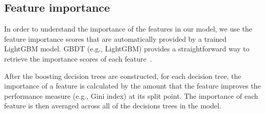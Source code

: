
\subsection{Feature importance}

In order to understand the importance of the features in our model, we use the feature importance scores that are automatically provided by a trained LightGBM model.
GBDT (e.g., LightGBM) provides a straightforward way to retrieve the importance scores of each feature~\cite{friedman2001elements}.

After the boosting decision trees are constructed, for each decision tree, the importance of a feature is calculated by the amount that the feature improves the performance measure (e.g., Gini index) at its split point.
The importance of each feature is then averaged across all of the decisions trees in the model. 


